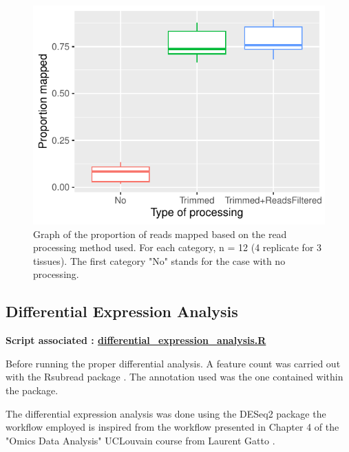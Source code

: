 \documentclass[a4paper, 11pt]{article}
\begin{document}
\begin{multicols}{2}
\begin{figure}[H]
    \centering
    \includegraphics[width=1\columnwidth]{Figures/mapping_props.pdf}
    \caption{\footnotesize{Graph of the proportion of reads mapped based on the read processing method used. For each category, n = 12 (4 replicate for 3 tissues). The first category "No" stands for the case with no processing.}}
    \label{fig:mapping}
\end{figure}


\subsection{Differential Expression Analysis}
\begin{scriptsize}
	\textbf{Script associated : \href{https://github.com/leopoldguyot/BINF-402_Transcriptomic_Project/blob/main/differential_expression_analysis.R}{differential\_expression\_analysis.R}} 
\end{scriptsize}


Before running the proper differential analysis. A feature count was carried out with the Rsubread package \citep{Rsubread}. The annotation used was the one contained within the package. 

The differential expression analysis was done using the DESeq2 package \citep{DESeq2} the workflow employed is inspired from the workflow presented in Chapter 4 of the "Omics Data Analysis" UCLouvain course from Laurent Gatto \citep{Gatto_Loriot}.


\end{multicols}
\end{document}
